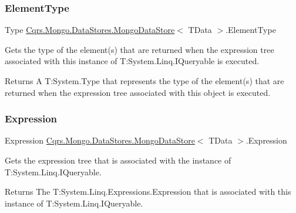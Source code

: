 \subsubsection{\texorpdfstring{Element\+Type}{ElementType}}
{\footnotesize\ttfamily Type \hyperlink{classCqrs_1_1Mongo_1_1DataStores_1_1MongoDataStore}{Cqrs.\+Mongo.\+Data\+Stores.\+Mongo\+Data\+Store}$<$ T\+Data $>$.Element\+Type\hspace{0.3cm}{\ttfamily [get]}}



Gets the type of the element(s) that are returned when the expression tree associated with this instance of T\+:\+System.\+Linq.\+I\+Queryable is executed. 

\begin{DoxyReturn}{Returns}
A T\+:\+System.\+Type that represents the type of the element(s) that are returned when the expression tree associated with this object is executed. 
\end{DoxyReturn}
\mbox{\label{classCqrs_1_1Mongo_1_1DataStores_1_1MongoDataStore_a1a151694ae4eef805bd64aa7a3ae70ed}} 
\subsubsection{\texorpdfstring{Expression}{Expression}}
{\footnotesize\ttfamily Expression \hyperlink{classCqrs_1_1Mongo_1_1DataStores_1_1MongoDataStore}{Cqrs.\+Mongo.\+Data\+Stores.\+Mongo\+Data\+Store}$<$ T\+Data $>$.Expression\hspace{0.3cm}{\ttfamily [get]}}



Gets the expression tree that is associated with the instance of T\+:\+System.\+Linq.\+I\+Queryable. 

\begin{DoxyReturn}{Returns}
The T\+:\+System.\+Linq.\+Expressions.\+Expression that is associated with this instance of T\+:\+System.\+Linq.\+I\+Queryable. 
\end{DoxyReturn}
\mbox{\label{classCqrs_1_1Mongo_1_1DataStores_1_1MongoDataStore_a29e943482b60be2d3d253af59d3fc5eb}} 
